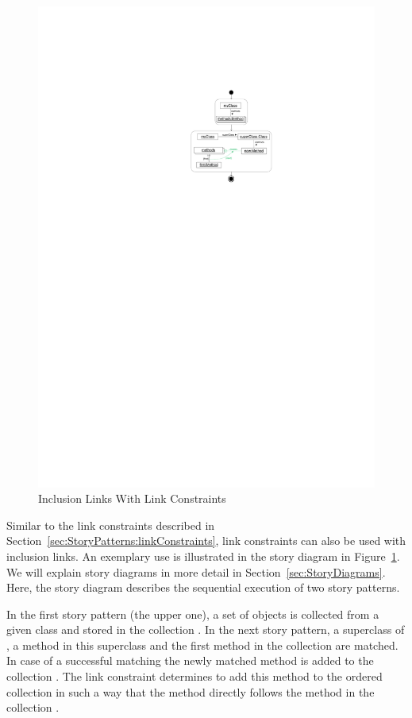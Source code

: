 {\begin{figure}[htb]
  \centering
  \includegraphics[scale=.8]{figures/LinkConstraints1}
  \caption{Inclusion Links With Link Constraints}
  \label{fig:collectionsLinkConstraints}
\end{figure}

Similar to the link constraints described in Section~\ref{sec:StoryPatterns:linkConstraints}, link constraints can also be used with inclusion links.
An exemplary use is illustrated in the story diagram in Figure~\ref{fig:collectionsLinkConstraints}.
We will explain story diagrams in more detail in Section~\ref{sec:StoryDiagrams}.
Here, the story diagram describes the sequential execution of two story patterns.

In the first story pattern (the upper one), a set of  objects is collected from a given class  and stored in the collection .
In the next story pattern, a superclass of , a method in this superclass and the first method in the collection  are matched.
In case of a successful matching the newly matched method  is added to the collection .
The link constraint  determines to add this method to the ordered collection in such a way
that the method  directly follows the method  in the collection .



} %

